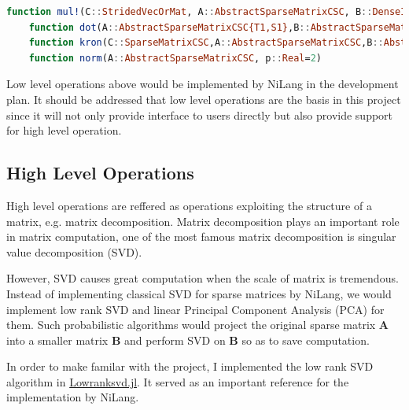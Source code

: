\begin{lstlisting}[language=Julia]
    function mul!(C::StridedVecOrMat, A::AbstractSparseMatrixCSC, B::DenseInputVecOrMat, α::Number, β::Number)
    function dot(A::AbstractSparseMatrixCSC{T1,S1},B::AbstractSparseMatrixCSC{T2,S2}) where {T1,T2,S1,S2}
    function kron(C::SparseMatrixCSC,A::AbstractSparseMatrixCSC,B::AbstractSparseMatrixCSC)
    function norm(A::AbstractSparseMatrixCSC, p::Real=2)
\end{lstlisting}
Low level operations above would be implemented by NiLang in the development plan. It should be addressed that low level operations are the basis in this project since it will not only provide interface to users directly but also provide support for high level operation.


\subsection{High Level Operations}
High level operations are reffered as operations exploiting the structure of a matrix, e.g. matrix decomposition. Matrix decomposition plays an important role in matrix computation, one of the most famous matrix decomposition is singular value decomposition (SVD). 
\par However, SVD causes great computation when the scale of matrix is tremendous. Instead of implementing classical SVD for sparse matrices by NiLang, we would implement low rank SVD and linear Principal Component Analysis (PCA) for them. Such probabilistic algorithms would project the original sparse matrix $\mathbf{A}$ into a smaller matrix $\mathbf{B}$ and perform SVD on $\mathbf{B}$ so as to save computation. 
\par In order to make familar with the project, I implemented the low rank SVD algorithm in \href{https://github.com/jieli-matrix/Lowranksvd.jl/tree/dev}{Lowranksvd.jl}. It served as an important reference for the implementation by NiLang.  

